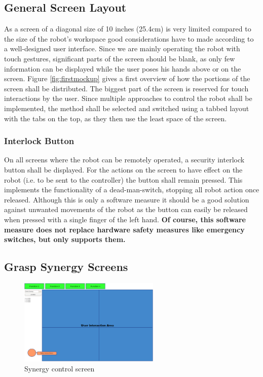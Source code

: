 \subsection{General Screen Layout}

As a screen of a diagonal size of 10 inches (25.4cm) is very limited compared to the size of the robot's workspace good considerations have to made according to a well-designed user interface. Since we are mainly operating the robot with touch gestures, significant parts of the screen should be blank, as only few information can be displayed while the user poses his hands above or on the screen. Figure \ref{fig:firstmockup} gives a first overview of how the portions of the screen shall be distributed. The biggest part of the screen is reserved for touch interactions by the user. Since multiple approaches to control the robot shall be implemented, the method shall be selected and switched using a tabbed layout with the tabs on the top, as they then use the least space of the screen.

\subsubsection{Interlock Button}
On all screens where the robot can be remotely operated, a security interlock button shall be displayed. For the actions on the screen to have effect on the robot (i.e. to be sent to the controller) the button shall remain pressed. This implements the functionality of a dead-man-switch, stopping all robot action once released. Although this is only a software measure it should be a good solution against unwanted movements of the robot as the button can easily be released when pressed with a single finger of the left hand. \textbf{Of course, this software measure does not replace hardware safety measures like emergency switches, but only supports them.}

\subsection{Grasp Synergy Screens}

\begin{figure}
	\caption{\label{fig:screen:synergy}Synergy control screen}
	\includegraphics[width=0.6\textwidth]{assets/chpt_concepts/grasp_synergy_page}
\end{figure}

